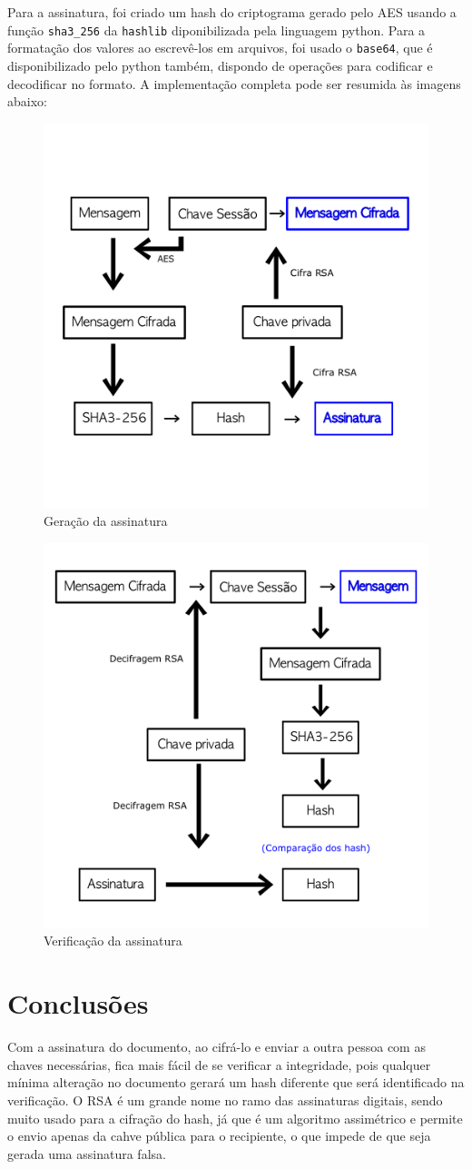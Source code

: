 \documentclass[12pt]{article}
\begin{document}
Para a assinatura, foi criado um hash do criptograma gerado pelo AES usando a função \texttt{sha3\_256} da \texttt{hashlib} diponibilizada pela linguagem python. Para a formatação dos valores ao escrevê-los em arquivos, foi usado o \texttt{base64}, que é disponibilizado pelo python também, dispondo de operações para codificar e decodificar no formato. A implementação completa pode ser resumida às imagens abaixo:

\begin{figure}[H]
	\centering
    \includegraphics[width=.65\textwidth]{img/assinatura.png}
    \caption{Geração da assinatura}
\end{figure}

\begin{figure}[H]
	\centering
    \includegraphics[width=.65\textwidth]{img/verificacao.png}
    \caption{Verificação da assinatura}
\end{figure}

\section{Conclusões}

Com a assinatura do documento, ao cifrá-lo e enviar a outra pessoa com as chaves necessárias, fica mais fácil de se verificar a integridade, pois qualquer mínima alteração no documento gerará um hash diferente que será identificado na verificação. O RSA é um grande nome no ramo das assinaturas digitais, sendo muito usado para a cifração do hash, já que é um algoritmo assimétrico e permite o envio apenas da cahve pública para o recipiente, o que impede de que seja gerada uma assinatura falsa.
\end{document}
